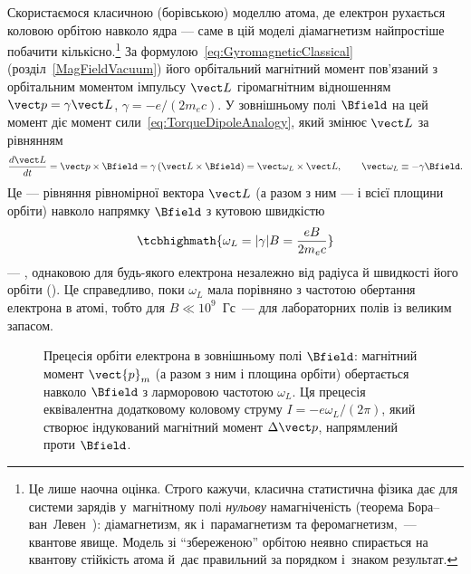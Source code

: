 Скористаємося класичною (борівською) моделлю атома, де електрон рухається коловою орбітою навколо ядра --- саме в цій моделі діамагнетизм найпростіше побачити кількісно.\footnote{Це лише наочна оцінка. Строго
кажучи, класична статистична фізика дає для системи зарядів у~магнітному полі \emph{нульову} намагніченість (теорема Бора--ван~Левен~\cite{Bohr1911,VanLeeuwen1921}):
діамагнетизм, як і~парамагнетизм та феромагнетизм,~--- квантове явище. Модель зі \enquote{збереженою} орбітою неявно спирається на
квантову стійкість атома й~дає правильний за порядком і~знаком результат.} За формулою~\eqref{eq:GyromagneticClassical} (розділ~\ref{MagFieldVacuum}) його орбітальний
магнітний момент пов'язаний з орбітальним моментом імпульсу $\vect L$ гіромагнітним відношенням $\vect p = \gamma\vect L$, $\gamma=-e/(2m_ec)$. У
зовнішньому полі $\Bfield$ на цей момент діє момент сили~\eqref{eq:TorqueDipoleAnalogy}, який змінює $\vect L$ за рівнянням
\begin{equation*}
	\frac{d\vect L}{dt} = \vect p\times\Bfield = \gamma\left(\vect L\times\Bfield\right) = \vect\omega_L\times\vect L, \qquad
	\vect\omega_L\equiv-\gamma\Bfield.
\end{equation*}
Це --- рівняння рівномірної  вектора $\vect L$ (а разом з ним --- і всієї площини орбіти) навколо напрямку $\Bfield$ з кутовою
швидкістю
\begin{equation}\label{eq:LarmorFreqMag}
	\tcbhighmath{
		\omega_L = |\gamma|B = \frac{eB}{2m_ec}
	}
\end{equation}
--- , однаковою для будь-якого електрона незалежно від радіуса й швидкості його орбіти (). Це справедливо, поки $\omega_L$ мала порівняно з частотою обертання електрона в атомі, тобто для $B\ll10^{9}$~Гс~--- для лабораторних полів із великим запасом.

\begin{figure}[h!]\centering
\caption{Прецесія орбіти електрона в зовнішньому полі $\Bfield$: магнітний
момент $\vect{p}_m$ (а разом з ним і площина орбіти) обертається навколо
$\Bfield$ з ларморовою частотою $\omega_L$. Ця прецесія еквівалентна
додатковому коловому струму $I=-e\omega_L/(2\pi)$, який створює індукований
магнітний момент $\Delta\vect p$, напрямлений проти $\Bfield$.}
\label{pic:LarmorPrecession}
\end{figure}


